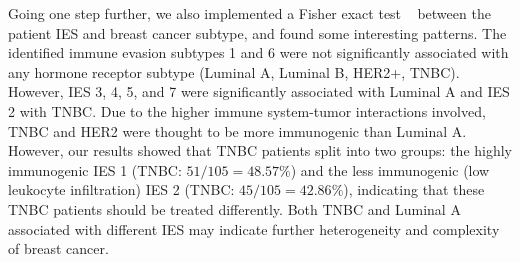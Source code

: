 \documentclass[a4paper, 11pt]{article}
\begin{document}
Going one step further, we also implemented a Fisher exact test ~\citep{fisher1922interpretation, fisher1956mathematics, upton1992fisher} between the patient IES and breast cancer subtype, and found some interesting patterns. The identified immune evasion subtypes 1 and 6 were not significantly associated with any hormone receptor subtype (Luminal A, Luminal B, HER2+, TNBC). However, IES 3, 4, 5, and 7 were significantly associated with Luminal A and IES 2 with TNBC. Due to the higher immune system-tumor interactions involved, TNBC and HER2 were thought to be more immunogenic than Luminal A. However, our results showed that TNBC patients split into two groups: the highly immunogenic IES 1 (TNBC: $51/105=48.57\%$) and the less immunogenic (low leukocyte infiltration) IES 2 (TNBC: $45/105=42.86\%$), indicating that these TNBC patients should be treated differently. Both TNBC and Luminal A associated with different IES may indicate further heterogeneity and complexity of breast cancer.\\

%
%
\end{document}
